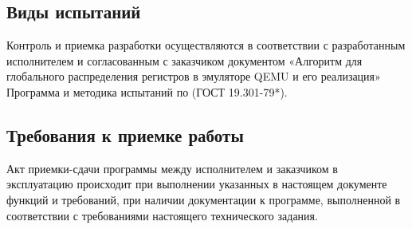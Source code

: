 \subsection{Виды испытаний}
Контроль и приемка разработки осуществляются в соответствии с разработанным исполнителем и согласованным с заказчиком документом «Алгоритм для глобального распределения регистров в эмуляторе QEMU и его реализация» Программа и методика испытаний по (ГОСТ 19.301-79*).

\subsection{Требования к приемке работы}
Акт приемки-сдачи программы между исполнителем и заказчиком в эксплуатацию происходит при выполнении указанных в настоящем документе функций и требований, при наличии документации к программе, выполненной в соответствии с требованиями настоящего технического задания.